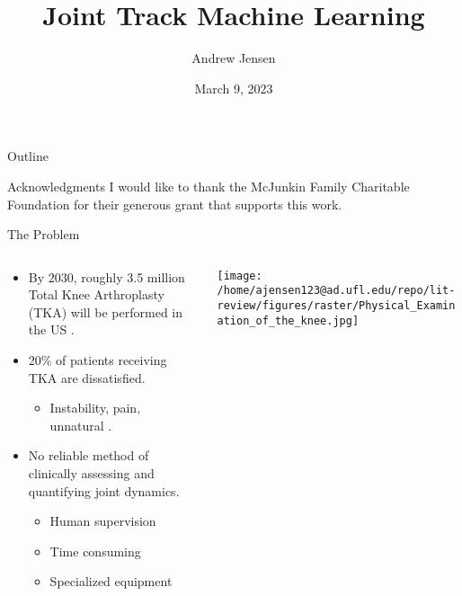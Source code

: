 \documentclass[presentation, aspectratio=1610]{beamer}
\author{Andrew Jensen}
\date{March 9, 2023}
\title{Joint Track Machine Learning}
\begin{document}
\maketitle
\begin{frame}{Outline}
\tableofcontents
\end{frame}

\begin{frame}[label={sec:org107cf94},standout]{Acknowledgments}
I would like to thank the McJunkin Family Charitable Foundation for their generous grant that supports this work.
\end{frame}
\begin{frame}[label={sec:org4139ab6}]{The Problem}
\begin{columns}
\begin{column}{0.5\columnwidth}
\begin{itemize}
\item By 2030, roughly 3.5 million Total Knee Arthroplasty (TKA) will be performed in the US \autocite{kurtzProjectionsPrimaryRevision2007}.
\item 20\% of patients receiving TKA are dissatisfied.
\begin{itemize}
\item Instability, pain, unnatural \autocites{bakerRolePainFunction2007}[][]{bournePatientSatisfactionTotal2010}[][]{scottPredictingDissatisfactionFollowing2010}.
\end{itemize}
\item No reliable method of clinically assessing and quantifying joint dynamics.
\begin{itemize}
\item Human supervision
\item Time consuming
\item Specialized equipment
\end{itemize}
\end{itemize}
\end{column}
\begin{column}{0.5\columnwidth}
\begin{center}
\texttt{[image: /home/ajensen123@ad.ufl.edu/repo/lit-review/figures/raster/Physical\_Examination\_of\_the\_knee.jpg]}
\end{center}
\end{column}
\end{columns}
\end{frame}
\end{document}
